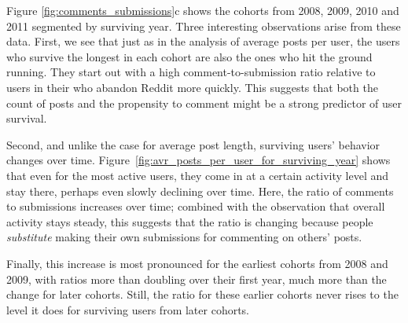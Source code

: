 Figure \ref{fig:comments_submissions}c shows the cohorts from 2008, 2009, 2010 and 2011 segmented by surviving year.  Three interesting observations arise from these data.  First, we see that just as in the analysis of average posts per user, the users who survive the longest in each cohort are also the ones who hit the ground running.  They start out with a high comment-to-submission ratio relative to users in their who abandon Reddit more quickly.  This suggests that both the count of posts and the propensity to comment might be a strong predictor of user survival.

Second, and unlike the case for average post length, surviving users' behavior changes over time.  Figure~\ref{fig:avr_posts_per_user_for_surviving_year} shows that even for the most active users, they come in at a certain activity level and stay there, perhaps even slowly declining over time.  Here, the ratio of comments to submissions increases over time; combined with the observation that overall activity stays steady, this suggests that the ratio is changing because people \textit{substitute} making their own submissions for commenting on others' posts.

Finally, this increase is most pronounced for the earliest cohorts from 2008 and 2009, with ratios more than doubling over their first year, much more than the change for later cohorts.  Still, the ratio for these earlier cohorts never rises to the level it does for surviving users from later cohorts.  

 


